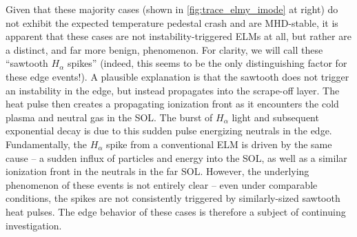 Given that these majority cases (shown in \cref{fig:trace_elmy_imode} at right) do not exhibit the expected temperature pedestal crash and are MHD-stable, it is apparent that these cases are not instability-triggered ELMs at all, but rather are a distinct, and far more benign, phenomenon.  For clarity, we will call these ``sawtooth $H_\alpha$ spikes'' (indeed, this seems to be the only distinguishing factor for these edge events!).  A plausible explanation is that the sawtooth does not trigger an instability in the edge, but instead propagates into the scrape-off layer.  The heat pulse then creates a propagating ionization front as it encounters the cold plasma and neutral gas in the SOL.  The burst of $H_\alpha$ light and subsequent exponential decay is due to this sudden pulse energizing neutrals in the edge.  Fundamentally, the $H_\alpha$ spike from a conventional ELM is driven by the same cause -- a sudden influx of particles and energy into the SOL, as well as a similar ionization front in the neutrals in the far SOL.  However, the underlying phenomenon of these events is not entirely clear -- even under comparable conditions, the spikes are not consistently triggered by similarly-sized sawtooth heat pulses.  The edge behavior of these cases is therefore a subject of continuing investigation.

